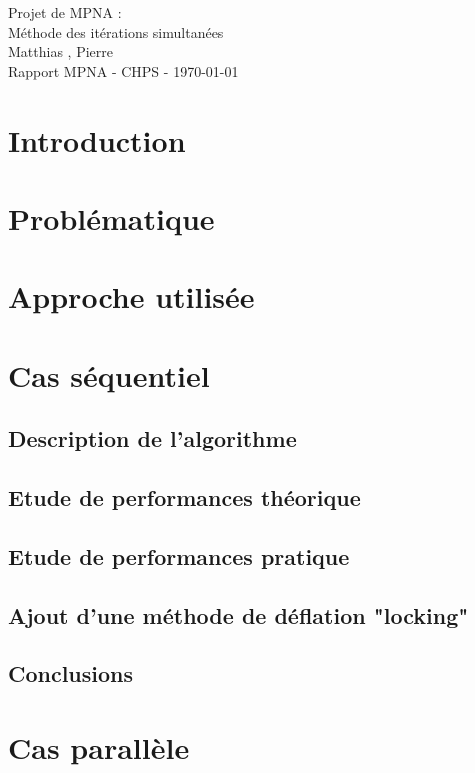 \documentclass[11pt,a4paper]{article}
\begin{document}
\begin{center}

	{\LARGE\centering Projet de MPNA :\\ Méthode des itérations simultanées}\\[1cm]

	{ Matthias , Pierre }\\[0.5cm]
	{Rapport MPNA - CHPS - \today}
\end{center}

\tableofcontents

\section{Introduction}

\section{Problématique}

\section{Approche utilisée}

\section{Cas séquentiel}

	\subsection{Description de l'algorithme}
	\subsection{Etude de performances théorique}
	\subsection{Etude de performances pratique}
	\subsection{Ajout d'une méthode de déflation "locking"}
	\subsection{Conclusions}

\section{Cas parallèle}
	
\end{document}

